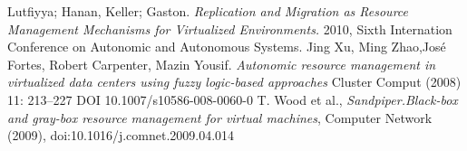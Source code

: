 \documentclass[conference]{IEEEtran}
\begin{document}

%
%
%
\begin{thebibliography}{1}

Lutfiyya; Hanan, Keller; Gaston.
\emph{Replication and Migration as Resource Management Mechanisms for Virtualized Environments.}
2010, Sixth Internation Conference on Autonomic and Autonomous Systems.
Jing Xu, Ming Zhao,José Fortes, Robert Carpenter,
Mazin Yousif. \emph{Autonomic resource management in virtualized data centers using
fuzzy logic-based approaches} Cluster Comput (2008) 11: 213–227
DOI 10.1007/s10586-008-0060-0
T. Wood et al., \emph{Sandpiper.Black-box and gray-box resource management for virtual machines}, Computer Network (2009), doi:10.1016/j.comnet.2009.04.014


\end{thebibliography}




\end{document}
